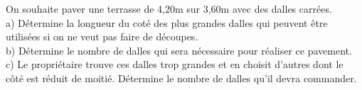 %
%
    On souhaite paver une terrasse de 4,20m sur 3,60m avec des dalles carrées.\\
    a) Détermine la longueur du coté des plus grandes dalles qui peuvent être utilisées si on ne veut pas faire de découpes.\\
    b) Détermine le nombre de dalles qui sera nécessaire pour réaliser ce pavement.\\
    c) Le propriétaire trouve ces dalles trop grandes et en choisit d'autres dont le côté est réduit de moitié.
    Détermine le nombre de dalles qu'il devra commander.
